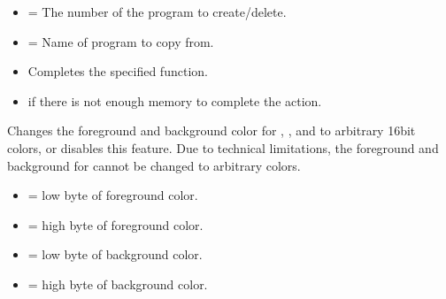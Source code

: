 \documentclass[letterpaper,10pt,english]{sphinxmanual}
\begin{document}
\begin{description}
\begin{description}
\begin{itemize}
\item {} 
\sphinxAtStartPar
{} = The number of the  program to create/delete.

\item {} 
\sphinxAtStartPar
{} = Name of program to copy from.

\end{itemize}

\begin{itemize}
\item {} 
\sphinxAtStartPar
Completes the specified function.

\end{itemize}

\begin{itemize}
\item {} 
\sphinxAtStartPar
{} if there is not enough memory to complete the action.

\end{itemize}

\end{description}

\sphinxAtStartPar
Changes the foreground and background color for , , and  to arbitrary 16\sphinxhyphen{}bit colors, or disables this feature. Due to technical limitations, the foreground and background for  cannot be changed to arbitrary colors.
\begin{description}
\begin{itemize}
\item {} 
\sphinxAtStartPar
{} = low byte of foreground color.

\item {} 
\sphinxAtStartPar
{} = high byte of foreground color.

\item {} 
\sphinxAtStartPar
{} = low byte of background color.

\item {} 
\sphinxAtStartPar
{} = high byte of background color.


\end{itemize}
\end{description}
\end{description}
\end{document}
